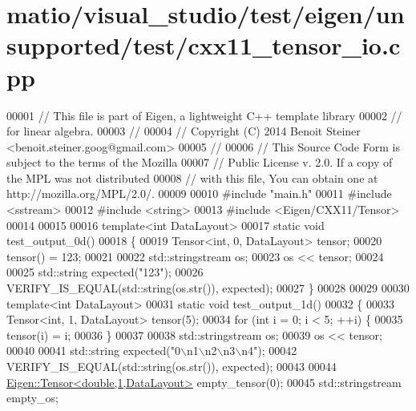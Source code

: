 \hypertarget{matio_2visual__studio_2test_2eigen_2unsupported_2test_2cxx11__tensor__io_8cpp_source}{}\section{matio/visual\+\_\+studio/test/eigen/unsupported/test/cxx11\+\_\+tensor\+\_\+io.cpp}
\label{matio_2visual__studio_2test_2eigen_2unsupported_2test_2cxx11__tensor__io_8cpp_source}

\begin{DoxyCode}
00001 \textcolor{comment}{// This file is part of Eigen, a lightweight C++ template library}
00002 \textcolor{comment}{// for linear algebra.}
00003 \textcolor{comment}{//}
00004 \textcolor{comment}{// Copyright (C) 2014 Benoit Steiner <benoit.steiner.goog@gmail.com>}
00005 \textcolor{comment}{//}
00006 \textcolor{comment}{// This Source Code Form is subject to the terms of the Mozilla}
00007 \textcolor{comment}{// Public License v. 2.0. If a copy of the MPL was not distributed}
00008 \textcolor{comment}{// with this file, You can obtain one at http://mozilla.org/MPL/2.0/.}
00009 
00010 \textcolor{preprocessor}{#include "main.h"}
00011 \textcolor{preprocessor}{#include <sstream>}
00012 \textcolor{preprocessor}{#include <string>}
00013 \textcolor{preprocessor}{#include <Eigen/CXX11/Tensor>}
00014 
00015 
00016 \textcolor{keyword}{template}<\textcolor{keywordtype}{int} DataLayout>
00017 \textcolor{keyword}{static} \textcolor{keywordtype}{void} test\_output\_0d()
00018 \{
00019   Tensor<int, 0, DataLayout> tensor;
00020   tensor() = 123;
00021 
00022   std::stringstream os;
00023   os << tensor;
00024 
00025   std::string expected(\textcolor{stringliteral}{"123"});
00026   VERIFY\_IS\_EQUAL(std::string(os.str()), expected);
00027 \}
00028 
00029 
00030 \textcolor{keyword}{template}<\textcolor{keywordtype}{int} DataLayout>
00031 \textcolor{keyword}{static} \textcolor{keywordtype}{void} test\_output\_1d()
00032 \{
00033   Tensor<int, 1, DataLayout> tensor(5);
00034   \textcolor{keywordflow}{for} (\textcolor{keywordtype}{int} i = 0; i < 5; ++i) \{
00035     tensor(i) = i;
00036   \}
00037 
00038   std::stringstream os;
00039   os << tensor;
00040 
00041   std::string expected(\textcolor{stringliteral}{"0\(\backslash\)n1\(\backslash\)n2\(\backslash\)n3\(\backslash\)n4"});
00042   VERIFY\_IS\_EQUAL(std::string(os.str()), expected);
00043 
00044   \hyperlink{class_eigen_1_1_tensor}{Eigen::Tensor<double,1,DataLayout>} empty\_tensor(0);
00045   std::stringstream empty\_os;

\end{DoxyCode}
